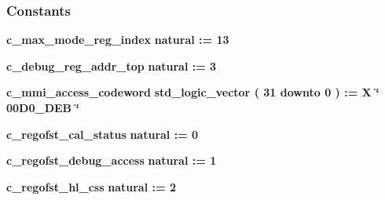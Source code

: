 \subsubsection*{Constants}
 \begin{DoxyCompactItemize}
\item 
{\bf c\+\_\+max\+\_\+mode\+\_\+reg\+\_\+index} {\bfseries \textcolor{comment}{natural}\textcolor{vhdlchar}{ }\textcolor{vhdlchar}{ }\textcolor{vhdlchar}{\+:}\textcolor{vhdlchar}{=}\textcolor{vhdlchar}{ }\textcolor{vhdlchar}{ } \textcolor{vhdldigit}{13} \textcolor{vhdlchar}{ }} 
\item 
{\bf c\+\_\+debug\+\_\+reg\+\_\+addr\+\_\+top} {\bfseries \textcolor{comment}{natural}\textcolor{vhdlchar}{ }\textcolor{vhdlchar}{ }\textcolor{vhdlchar}{\+:}\textcolor{vhdlchar}{=}\textcolor{vhdlchar}{ }\textcolor{vhdlchar}{ } \textcolor{vhdldigit}{3} \textcolor{vhdlchar}{ }} 
\item 
{\bf c\+\_\+mmi\+\_\+access\+\_\+codeword} {\bfseries \textcolor{comment}{std\+\_\+logic\+\_\+vector}\textcolor{vhdlchar}{ }\textcolor{vhdlchar}{(}\textcolor{vhdlchar}{ }\textcolor{vhdlchar}{ } \textcolor{vhdldigit}{31} \textcolor{vhdlchar}{ }\textcolor{keywordflow}{downto}\textcolor{vhdlchar}{ }\textcolor{vhdlchar}{ } \textcolor{vhdldigit}{0} \textcolor{vhdlchar}{ }\textcolor{vhdlchar}{)}\textcolor{vhdlchar}{ }\textcolor{vhdlchar}{ }\textcolor{vhdlchar}{ }\textcolor{vhdlchar}{\+:}\textcolor{vhdlchar}{=}\textcolor{vhdlchar}{ }\textcolor{vhdlchar}{ }\textcolor{vhdlchar}{X}\textcolor{vhdlchar}{ }\textcolor{keyword}{\char`\"{} 00\+D0\+\_\+D\+E\+B \char`\"{}}\textcolor{vhdlchar}{ }} 
\item 
{\bf c\+\_\+regofst\+\_\+cal\+\_\+status} {\bfseries \textcolor{comment}{natural}\textcolor{vhdlchar}{ }\textcolor{vhdlchar}{ }\textcolor{vhdlchar}{\+:}\textcolor{vhdlchar}{=}\textcolor{vhdlchar}{ }\textcolor{vhdlchar}{ } \textcolor{vhdldigit}{0} \textcolor{vhdlchar}{ }} 
\item 
{\bf c\+\_\+regofst\+\_\+debug\+\_\+access} {\bfseries \textcolor{comment}{natural}\textcolor{vhdlchar}{ }\textcolor{vhdlchar}{ }\textcolor{vhdlchar}{\+:}\textcolor{vhdlchar}{=}\textcolor{vhdlchar}{ }\textcolor{vhdlchar}{ } \textcolor{vhdldigit}{1} \textcolor{vhdlchar}{ }} 
\item 
{\bf c\+\_\+regofst\+\_\+hl\+\_\+css} {\bfseries \textcolor{comment}{natural}\textcolor{vhdlchar}{ }\textcolor{vhdlchar}{ }\textcolor{vhdlchar}{\+:}\textcolor{vhdlchar}{=}\textcolor{vhdlchar}{ }\textcolor{vhdlchar}{ } \textcolor{vhdldigit}{2} \textcolor{vhdlchar}{ }} 

\end{DoxyCompactItemize}
